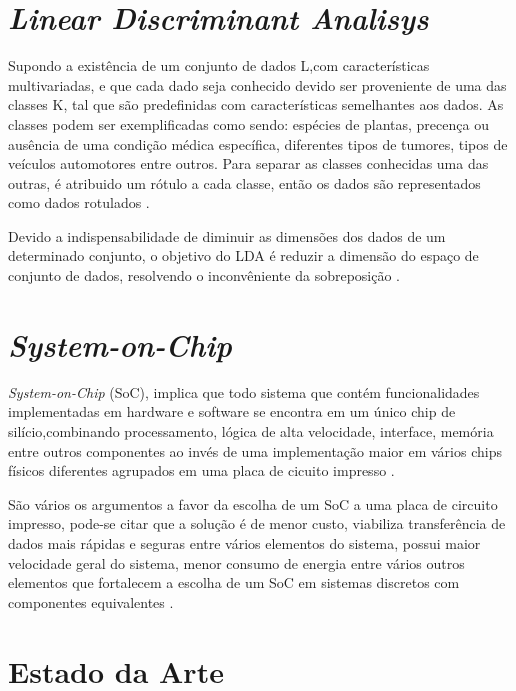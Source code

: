 \section{\textit{Linear Discriminant Analisys}}
Supondo a existência de um conjunto de dados L,com características multivariadas, e que cada dado
seja conhecido devido ser proveniente de uma das  classes K, tal que são predefinidas com características
semelhantes aos dados. As classes podem ser exemplificadas como sendo: espécies de plantas,
precença ou ausência de uma condição médica específica, diferentes tipos de tumores, tipos de veículos automotores
entre outros. Para separar as classes conhecidas uma das outras, é atribuido um rótulo a cada classe, então os dados são
representados como dados rotulados \cite{izenmanLDA}.


Devido a indispensabilidade de diminuir as dimensões dos dados de um determinado conjunto, o objetivo do LDA
é reduzir a dimensão do espaço de conjunto de dados, resolvendo o inconvêniente da sobreposição \cite{SinghLDA}.


\section{\textit{System-on-Chip}}

\textit{System-on-Chip} (SoC), implica que todo sistema que contém funcionalidades implementadas em hardware e software se encontra em um único chip de silício,combinando processamento, lógica de alta velocidade, interface, memória entre outros componentes ao invés de uma implementação maior em vários chips físicos diferentes agrupados em uma placa 
de cicuito impresso \cite{zynqBook}.

São vários os argumentos a favor da escolha de um SoC a uma placa de circuito impresso, pode-se citar que a solução é de menor custo, viabiliza transferência de dados mais rápidas e seguras entre vários elementos do sistema, possui maior velocidade geral do sistema, menor consumo de energia entre vários outros elementos que fortalecem a escolha de um SoC em sistemas discretos com componentes equivalentes \cite{zynqBook}.


\section{Estado da Arte}



